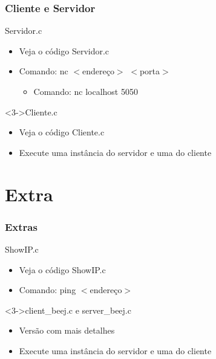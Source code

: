 \documentclass[10pt, xcolor=x11names]{beamer}
\newcommand\Fontvi{\fontsize{8}{7.2}\selectfont}
\begin{document}
\begin{frame}\frametitle{Cliente e Servidor}
	\begin{example}{Servidor.c}
		\begin{itemize}
			\item<1-> Veja o código Servidor.c \cite{bruno}
			\item<2-> Comando: nc $<$endereço$>$ $<$porta$>$
			\begin{itemize}
				\item Comando: nc localhost 5050
			\end{itemize}
		\end{itemize}
	\end{example}
	
	\begin{example}<3->{Cliente.c}
		\begin{itemize}
			\item<3-> Veja o código Cliente.c \cite{bruno}
			\item<4-> Execute uma instância do servidor e uma do cliente
		\end{itemize}
	\end{example}
\end{frame}


\begin{frame}
	\Fontvi
	\nocite{*}
	
	
\end{frame}
\section{Extra} %

\begin{frame}\frametitle{Extras}
	\begin{example}{ShowIP.c}
		\begin{itemize}
			\item<1-> Veja o código ShowIP.c \cite{bruno}
			\item<2-> Comando: ping $<$endereço$>$
		\end{itemize}
	\end{example}
	
	\begin{example}<3->{client\_beej.c e server\_beej.c}
		\begin{itemize}
			\item<3-> Versão com mais detalhes
			\item<3-> Execute uma instância do servidor e uma do cliente
		\end{itemize}
	\end{example}
\end{frame}
\end{document}
